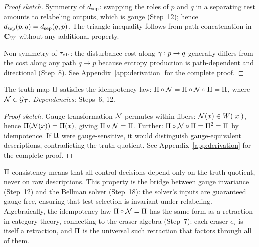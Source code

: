 \begin{theorem}
\begin{proof}[Proof sketch]
Symmetry of $d_{\mathrm{sep}}$: swapping the roles of $p$ and $q$ in a separating
test amounts to relabeling outputs, which is gauge (Step~12);
hence $d_{\mathrm{sep}}(p,q) = d_{\mathrm{sep}}(q,p)$.  The triangle inequality follows from
path concatenation in $\mathbf{C}_W$ without any additional property.

Non-symmetry of $\tau_{\mathrm{dir}}$: the disturbance cost along $\gamma: p \to q$
generally differs from the cost along any path $q \to p$ because entropy
production is path-dependent and directional (Step~8).
See Appendix~\ref{app:derivation} for the complete proof.
\end{proof}
\end{theorem}

\begin{theorem}
\label{thm:pi-consistent}
The truth map $\Pi$ satisfies the idempotency law:
$\Pi \circ \mathcal{N} = \Pi \circ \mathcal{N} \circ \Pi = \Pi$,
where $\mathcal{N} \in \mathcal{G}_{\mathcal{T}}$.
\emph{Dependencies:} Steps~6, 12.
\begin{proof}[Proof sketch]
Gauge transformation $\mathcal{N}$ permutes within fibers: $\mathcal{N}(x) \in W([x])$, hence $\Pi(\mathcal{N}(x)) = \Pi(x)$, giving $\Pi \circ \mathcal{N} = \Pi$.  Further: $\Pi \circ \mathcal{N} \circ \Pi = \Pi^2 = \Pi$ by idempotence.  If $\Pi$ were gauge-sensitive, it would distinguish gauge-equivalent descriptions, contradicting the truth quotient.
See Appendix~\ref{app:derivation} for the complete proof.
\end{proof}
\end{theorem}

\begin{remark}
\label{rem:pi-consistency-bridge}
$\Pi$-consistency means that all control decisions depend only on
the truth quotient, never on raw descriptions.  This property is the
bridge between gauge invariance (Step~12) and the Bellman solver
(Step~18): the solver's inputs are guaranteed gauge-free, ensuring that
test selection is invariant under relabeling.  Algebraically, the
idempotency law $\Pi \circ \mathcal{N} = \Pi$ has the same form as a
retraction in category theory, connecting to the eraser algebra
(Step~7): each eraser $e_\tau$ is itself a retraction, and $\Pi$ is
the universal such retraction that factors through all of them.
\end{remark}


